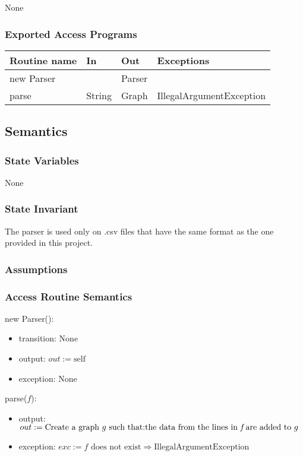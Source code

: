 \documentclass[12pt]{article}
\begin{document}
None

\subsubsection*{Exported Access Programs}

\begin{tabular}{| l | l | l | l |}
	\hline
	\textbf{Routine name} & \textbf{In} & \textbf{Out} & \textbf{Exceptions}\\
	\hline
	new Parser & ~ & Parser & ~\\
	\hline
	parse & String & Graph & IllegalArgumentException\\
	\hline
\end{tabular}

\subsection*{Semantics}

\subsubsection*{State Variables}

None

\subsubsection*{State Invariant}

The parser is used only on .csv files that have the same format as the one provided in this project.

\subsubsection* {Assumptions}

\subsubsection*{Access Routine Semantics}

\noindent new Parser():
\begin{itemize}
	\item transition: None
	\item output: $out := \mbox{self}$
	\item exception: None
\end{itemize}

\noindent parse($f$):
\begin{itemize}
	\item output: $out := \text{Create a graph } g \text{ such that:} \\
	\text{the data from the lines in } \textit{f} \text{ are added to } g$
	\item exception: $exc := f\text{ does not exist} \Rightarrow  \mbox{IllegalArgumentException}$
\end{itemize}
\end{document}
